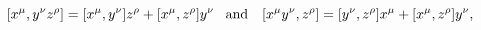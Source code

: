 \begin{equation}
\lbrack x^{\mu },y^{\nu }z^{\rho }]=[x^{\mu },y^{\nu }]z^{\rho }+[x^{\mu
},z^{\rho }]y^{\nu }\mbox{\,\,\, and \,\,\,\,}
[x^{\mu }y^{\nu },z^{\rho }]=[y^{\nu
},z^{\rho }]x^{\mu }+[x^{\mu },z^{\rho }]y^{\nu },
\end{equation}

